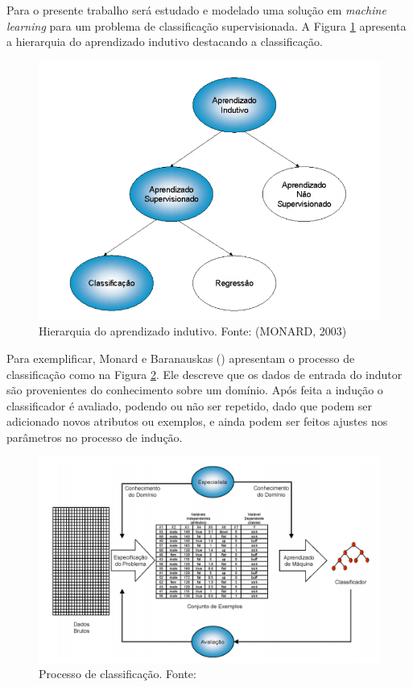 Para o presente trabalho será estudado e modelado uma solução em \textit{machine learning} para um problema de classificação supervisionada. A Figura \ref{fig:hierarquia_aprendizado} apresenta a hierarquia do aprendizado indutivo destacando a classificação.

\begin{figure}[H]
    \centering
    \includegraphics[scale=0.45]{figuras/referencial_teorico/hierarquia_aprendizado.png}
    \caption[Hierarquia do aprendizado indutivo]{Hierarquia do aprendizado indutivo. Fonte: (MONARD, 2003)}
    \label{fig:hierarquia_aprendizado}
\end{figure}

Para exemplificar, Monard e Baranauskas (\citeyear{Monard:2003}) apresentam o processo de classificação como na Figura \ref{fig:processo_classificacao}. Ele descreve que os dados de entrada do indutor são provenientes do conhecimento sobre um domínio. Após feita a indução o classificador é avaliado, podendo ou não ser repetido, dado que podem ser adicionado novos atributos ou exemplos, e ainda podem ser feitos ajustes nos parâmetros no processo de indução.

\begin{figure}[H]
    \centering
    \includegraphics[scale=0.3]{figuras/referencial_teorico/processo_classificacao.png}
    \caption[Processo de classificação]{Processo de classificação. Fonte: \cite{Monard:2003}}
    \label{fig:processo_classificacao}
\end{figure}

